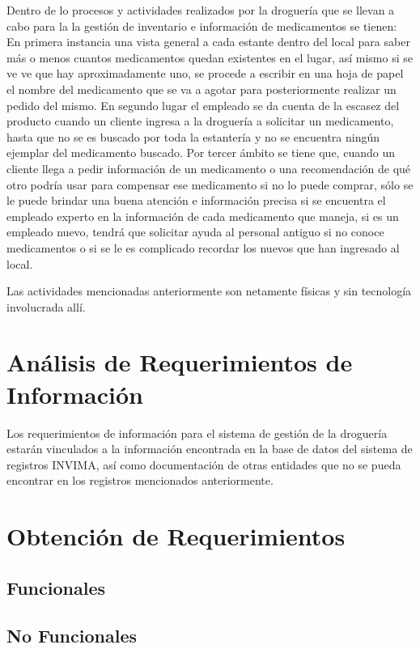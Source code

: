 Dentro de lo procesos y actividades realizados por la droguería que se llevan a cabo para la la gestión de inventario e información de medicamentos se tienen:
En primera instancia una vista general a cada estante dentro del local para saber más o menos cuantos medicamentos quedan existentes en el lugar, así mismo si se ve ve que hay aproximadamente uno, se procede a escribir en una hoja de papel el nombre del medicamento que se va a agotar para posteriormente realizar un pedido del mismo. 
En segundo lugar el empleado se da cuenta de la escasez del producto cuando un cliente ingresa a la droguería a solicitar un medicamento, hasta que no se es buscado por toda la estantería  y no se encuentra ningún ejemplar del medicamento buscado. 
Por tercer ámbito se tiene que, cuando un cliente llega a pedir información de un medicamento o una recomendación de qué otro podría usar para compensar ese medicamento si no lo puede comprar, sólo se le puede brindar una buena atención e información precisa si se encuentra el empleado experto en la información de cada medicamento que maneja, si es un empleado nuevo, tendrá que solicitar ayuda al personal antiguo si no conoce medicamentos o si se le es complicado recordar los nuevos que han ingresado al local.

Las actividades mencionadas anteriormente son netamente físicas y sin tecnología involucrada allí.


\section{An\'alisis de Requerimientos de Informaci\'on}

Los requerimientos de información para el sistema de gestión de la droguería estarán vinculados a la información encontrada en la base de datos del sistema de registros INVIMA, así como documentación de otras entidades que no se pueda encontrar en los registros mencionados anteriormente.


\section{Obtenci\'on de Requerimientos}
\subsection{Funcionales}

\subsection{No Funcionales}

